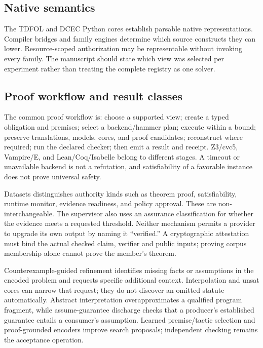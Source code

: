 \documentclass{article}
\begin{document}
\subsection{Native semantics}


The TDFOL and DCEC Python cores establish parsable native representations. Compiler bridges and family engines determine which source constructs they can lower. Resource-scoped authorization may be representable without invoking every family. The manuscript should state which view was selected per experiment rather than treating the complete registry as one solver.

\subsection{Proof workflow and result classes}

The common proof workflow is: choose a supported view; create a typed obligation and premises; select a backend/hammer plan; execute within a bound; preserve translations, models, cores, and proof candidates; reconstruct where required; run the declared checker; then emit a result and receipt. Z3/cvc5, Vampire/E, and Lean/Coq/Isabelle belong to different stages. A timeout or unavailable backend is not a refutation, and satisfiability of a favorable instance does not prove universal safety.

Datasets distinguishes authority kinds such as theorem proof, satisfiability, runtime monitor, evidence readiness, and policy approval. These are non-interchangeable. The supervisor also uses an assurance classification for whether the evidence meets a requested threshold. Neither mechanism permits a provider to upgrade its own output by naming it ``verified.'' A cryptographic attestation must bind the actual checked claim, verifier and public inputs; proving corpus membership alone cannot prove the member's theorem.

Counterexample-guided refinement identifies missing facts or assumptions in the encoded problem and requests specific additional context. Interpolation and unsat cores can narrow that request; they do not discover an omitted statute automatically. Abstract interpretation overapproximates a qualified program fragment, while assume-guarantee discharge checks that a producer's established guarantee entails a consumer's assumption. Learned premise/tactic selection and proof-grounded encoders improve search proposals; independent checking remains the acceptance operation.
\end{document}
